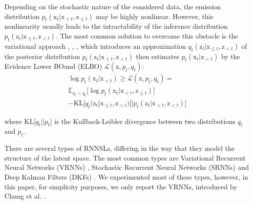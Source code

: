 \documentclass{article}
\begin{document}
Depending on the stochastic nature of the considered data, the emission distribution $p_t(\boldsymbol{\mathrm{x}}_t|\boldsymbol{\mathrm{x}}_{<t},\boldsymbol{\mathrm{z}}_{\leq t})$ may be highly nonlinear. However, this nonlinearity usually leads to the intractability of the inference distribution $p_t(\boldsymbol{\mathrm{z}}_t|\boldsymbol{\mathrm{x}}_{ \leq t},\boldsymbol{\mathrm{z}}_{<t})$. The most common solution to overcome this obstacle is the variational approach \cite{boulanger-lewandowski_modeling_2012}, \cite{chung_recurrent_2015}, \cite{fraccaro_sequential_2016}, which introduces an approximation $q_t(\boldsymbol{\mathrm{z}}_t|\boldsymbol{\mathrm{x}}_{ \leq t},\boldsymbol{\mathrm{z}}_{<t})$ of the posterior distribution $p_t(\boldsymbol{\mathrm{z}}_t|\boldsymbol{\mathrm{x}}_{ \leq t},\boldsymbol{\mathrm{z}}_{<t})$ then estimates $p_t(\boldsymbol{\mathrm{x}}_t|\boldsymbol{\mathrm{x}}_{<t})$  by the Evidence Lower BOund (ELBO) $\mathcal{L}(\mathrm{x},p_t,q_t)$:
\vspace{-0.2cm}
\begin{multline}
    \log p_t(\boldsymbol{\mathrm{x}}_t|\boldsymbol{\mathrm{x}}_{<t}) \geq \mathcal{L}(\mathrm{x},p_t,q_t) = \\
\mathbb{E}_{\boldsymbol{\mathrm{z}}_{t}\sim q_t}\big[\log p_t(\boldsymbol{\mathrm{x}}_t|\boldsymbol{\mathrm{x}}_{<t},\boldsymbol{\mathrm{z}}_{\leq t}) \big] \\
    - \mathrm{KL}\big[q_t(\boldsymbol{\mathrm{z}}_t|\boldsymbol{\mathrm{x}}_{ \leq t},\boldsymbol{\mathrm{z}}_{<t})||p_t(\boldsymbol{\mathrm{z}}_t|\boldsymbol{\mathrm{x}}_{<t},\boldsymbol{\mathrm{z}}_{<t}) \big] 
	\label{eqELBO}
\end{multline}




where $\mathrm{KL}\big[q_t||p_t\big] $ is the Kullback-Leibler divergence between two distributions $q_t$ and $p_t$. 


There are several types of RNNSLs, differing in the way that they model the structure of the latent space. The most common types are Variational Recurrent Neural Networks (VRNNs) \cite{chung_recurrent_2015}, Stochastic Recurrent Neural Networks (SRNNs) \cite{fraccaro_sequential_2016} and Deep Kalman Filters (DKFs) \cite{krishnan_deep_2017}.
We experimented most of these types, however, in this paper, for simplicity purposes, we only report the VRNNs, introduced by Chung et al. \cite{chung_recurrent_2015}.
\end{document}
